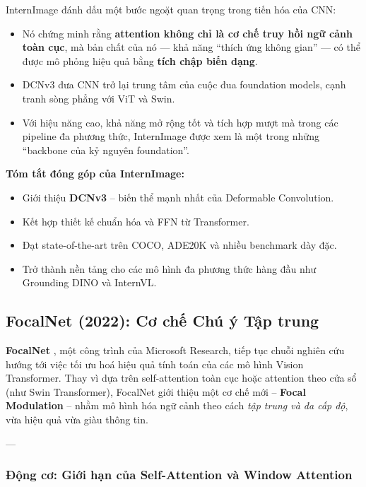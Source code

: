 InternImage đánh dấu một bước ngoặt quan trọng trong tiến hóa của CNN:
\begin{itemize}
	\item Nó chứng minh rằng \textbf{attention không chỉ là cơ chế truy hồi ngữ cảnh toàn cục}, mà bản chất của nó — khả năng “thích ứng không gian” — có thể được mô phỏng hiệu quả bằng \textbf{tích chập biến dạng}.
	\item DCNv3 đưa CNN trở lại trung tâm của cuộc đua foundation models, cạnh tranh sòng phẳng với ViT và Swin.
	\item Với hiệu năng cao, khả năng mở rộng tốt và tích hợp mượt mà trong các pipeline đa phương thức, InternImage được xem là một trong những “backbone của kỷ nguyên foundation”.
\end{itemize}

\begin{mdframed}[style=infobox]
	\textbf{Tóm tắt đóng góp của InternImage:}
	\begin{itemize}
		\item Giới thiệu \textbf{DCNv3} – biến thể mạnh nhất của Deformable Convolution.
		\item Kết hợp thiết kế chuẩn hóa và FFN từ Transformer.
		\item Đạt state-of-the-art trên COCO, ADE20K và nhiều benchmark dày đặc.
		\item Trở thành nền tảng cho các mô hình đa phương thức hàng đầu như Grounding DINO và InternVL.
	\end{itemize}
\end{mdframed}

\subsection{FocalNet (2022): Cơ chế Chú ý Tập trung}
\label{subsec:focalnet}

\textbf{FocalNet} \cite{Yang2022}, một công trình của Microsoft Research, tiếp tục chuỗi nghiên cứu hướng tới việc tối ưu hoá hiệu quả tính toán của các mô hình Vision Transformer.  
Thay vì dựa trên self-attention toàn cục hoặc attention theo cửa sổ (như Swin Transformer), FocalNet giới thiệu một cơ chế mới – \textbf{Focal Modulation} – nhằm mô hình hóa ngữ cảnh theo cách \textit{tập trung và đa cấp độ}, vừa hiệu quả vừa giàu thông tin.

---

\subsubsection{Động cơ: Giới hạn của Self-Attention và Window Attention}
\label{subsubsec:focalnet_motivation}

